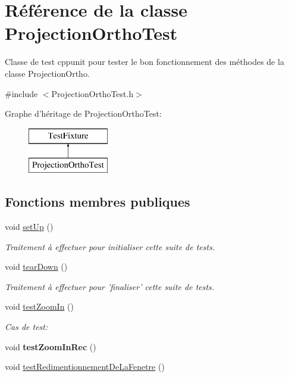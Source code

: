 \hypertarget{class_projection_ortho_test}{\section{Référence de la classe Projection\-Ortho\-Test}
\label{class_projection_ortho_test}
}


Classe de test cppunit pour tester le bon fonctionnement des méthodes de la classe Projection\-Ortho.  




{\ttfamily \#include $<$Projection\-Ortho\-Test.\-h$>$}

Graphe d'héritage de Projection\-Ortho\-Test\-:\begin{figure}[H]
\begin{center}
\leavevmode
\includegraphics[height=2.000000cm]{class_projection_ortho_test}
\end{center}
\end{figure}
\subsection*{Fonctions membres publiques}
\begin{DoxyCompactItemize}
\item 
void \hyperlink{class_projection_ortho_test_af0da04f36972757ddcfc1c09bba812a4}{set\-Up} ()
\begin{DoxyCompactList}\small\item\em Traitement à effectuer pour initialiser cette suite de tests. \end{DoxyCompactList}\item 
void \hyperlink{class_projection_ortho_test_afb91f8be6a3a9addf5909684b4f21cb0}{tear\-Down} ()
\begin{DoxyCompactList}\small\item\em Traitement à effectuer pour 'finaliser' cette suite de tests. \end{DoxyCompactList}\item 
void \hyperlink{class_projection_ortho_test_a5d71e64d8d04c9a0b3bb4b8c47fdabed}{test\-Zoom\-In} ()
\begin{DoxyCompactList}\small\item\em Cas de test\-: \end{DoxyCompactList}\item 
\hypertarget{class_projection_ortho_test_a3b6769bb39df65d8442a97e27340eb5a}{void {\bfseries test\-Zoom\-In\-Rec} ()}\label{class_projection_ortho_test_a3b6769bb39df65d8442a97e27340eb5a}

\item 
void \hyperlink{class_projection_ortho_test_a71a783cd71654c902724a186f9594a12}{test\-Redimentionnement\-De\-La\-Fenetre} ()
\end{DoxyCompactItemize}


